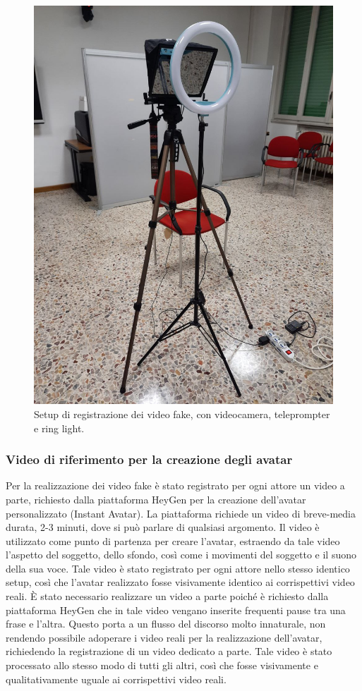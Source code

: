 \begin{figure}[t]
    \centering
    \includegraphics[width=0.62\linewidth]{images/recording_setup}
    \caption{Setup di registrazione dei video fake, con videocamera, teleprompter e ring light.}
    \label{fig:recording_setup}
\end{figure}

\subsubsection{Video di riferimento per la creazione degli avatar}

Per la realizzazione dei video fake è stato registrato per ogni attore un video a parte, richiesto dalla piattaforma HeyGen per la creazione dell'avatar personalizzato (Instant Avatar). La piattaforma richiede un video di breve-media durata, 2-3 minuti, dove si può parlare di qualsiasi argomento. Il video è utilizzato come punto di partenza per creare l'avatar, estraendo da tale video l'aspetto del soggetto, dello sfondo, così come i movimenti del soggetto e il suono della sua voce. Tale video è stato registrato per ogni attore nello stesso identico setup, così che l'avatar realizzato fosse visivamente identico ai corrispettivi video reali. È stato necessario realizzare un video a parte poiché è richiesto dalla piattaforma HeyGen che in tale video vengano inserite frequenti pause tra una frase e l'altra. Questo porta a un flusso del discorso molto innaturale, non rendendo possibile adoperare i video reali per la realizzazione dell'avatar, richiedendo la registrazione di un video dedicato a parte. Tale video è stato processato allo stesso modo di tutti gli altri, così che fosse visivamente e qualitativamente uguale ai corrispettivi video reali.

